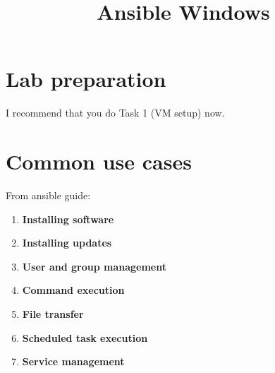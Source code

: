\documentclass[slides]{pgnotes}
\title{Ansible Windows}
\begin{document}
\maketitle

\tableofcontents

\section{Lab preparation}

I recommend that you do Task 1 (VM setup) now.


\section{Common use cases}

From ansible guide: 

\begin{enumerate}

\item \textbf{Installing software}

\item \textbf{Installing updates}

\item \textbf{User and group management}

\item \textbf{Command execution}

\item \textbf{File transfer}

\item \textbf{Scheduled task execution}

\item \textbf{Service management}

\end{enumerate}
\end{document}
